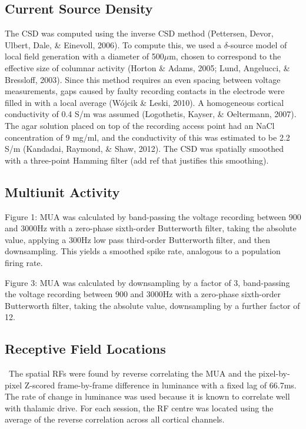 \subsection[Current Source Density]{Current Source Density}
The \ac{CSD} was computed using the inverse \ac{CSD} method (Pettersen, Devor, Ulbert, Dale, \& Einevoll, 2006).
To compute this, we used a $\delta$-source model of local field generation with a diameter of 500$\mu$m, chosen to correspond to the effective size of columnar activity (Horton \& Adams, 2005; Lund, Angelucci, \& Bressloff, 2003).
Since this method requires an even spacing between voltage measurements, gaps caused by faulty recording contacts in the electrode were filled in with a local average (W\'ojcik \& Leski, 2010).
A homogeneous cortical conductivity of 0.4 S/m was assumed (Logothetis, Kayser, \& Oeltermann, 2007).
The agar solution placed on top of the recording access point had an NaCl concentration of 9 mg/ml, and the conductivity of this was estimated to be 2.2 S/m (Kandadai, Raymond, \& Shaw, 2012).
The \ac{CSD} was spatially smoothed with a three-point Hamming filter (add ref that justifies this smoothing).

\subsection{Multiunit Activity }
Figure 1: \ac{MUA} was calculated by band-passing the voltage recording between 900 and 3000Hz with a zero-phase sixth-order Butterworth filter, taking the absolute value, applying a 300Hz low pass third-order Butterworth filter, and then downsampling.
This yields a smoothed spike rate, analogous to a population firing rate.

Figure 3: \ac{MUA} was calculated by downsampling by a factor of 3, band-passing the voltage recording between 900 and 3000Hz with a zero-phase sixth-order Butterworth filter, taking the absolute value, downsampling by a further factor of 12.

\subsection{Receptive Field Locations}
\ The spatial \acp{RF} were found by reverse correlating the \ac{MUA} and the pixel-by-pixel Z-scored frame-by-frame difference in luminance with a fixed lag of 66.7ms.
The rate of change in luminance was used because it is known to correlate well with thalamic drive.
For each session, the \ac{RF} centre was located using the average of the reverse correlation across all cortical channels.


